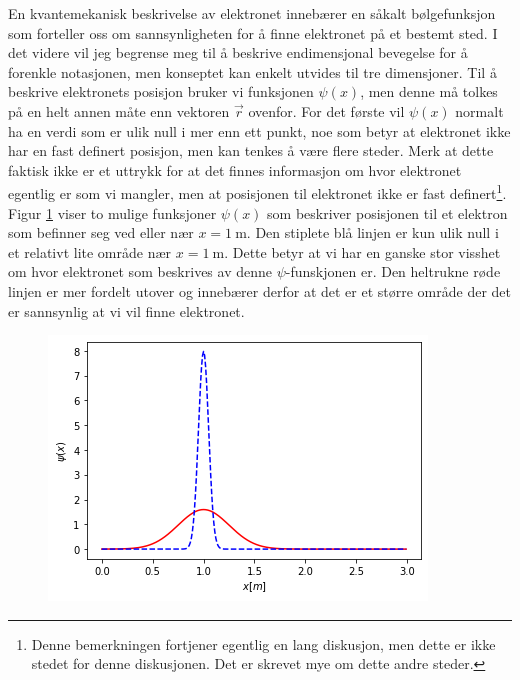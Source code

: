 En kvantemekanisk beskrivelse av elektronet innebærer en såkalt bølge\-funksjon som forteller oss om sannsynligheten for å finne elektronet på et bestemt sted. I det videre vil jeg begrense meg til å beskrive endimensjonal bevegelse for å forenkle notasjonen, men konseptet kan enkelt utvides til tre dimensjoner. Til å beskrive elektronets posisjon bruker vi funksjonen $\psi(x)$, men denne må tolkes på en helt annen måte enn vektoren $\vec{r}$ ovenfor. For det første vil $\psi(x)$ normalt ha en verdi som er ulik null i mer enn ett punkt, noe som betyr at elektronet ikke har en fast definert posisjon, men kan tenkes å være flere steder. Merk at dette faktisk ikke er et uttrykk for at det finnes informasjon om hvor elektronet egentlig er som vi mangler, men at posisjonen til elektronet ikke er fast definert\footnote{Denne bemerkningen fortjener egentlig en lang diskusjon, men dette er ikke stedet for denne diskusjonen. Det er skrevet mye om dette andre steder.}. Figur \ref{fig:kvante:psix} viser to mulige funksjoner $\psi(x)$ som beskriver posisjonen til et elektron som befinner seg ved eller nær $x=1~\mathrm{m}$. Den stiplete blå linjen er kun ulik null i et relativt lite område nær $x=1~\mathrm{m}$. Dette betyr at vi har en ganske stor visshet om hvor elektronet som beskrives av denne $\psi$-funskjonen er. Den heltrukne røde linjen er mer fordelt utover og innebærer derfor at det er et større område der det er sannsynlig at vi vil finne elektronet. 
\begin{figure}[htp]
\begin{center}
	\includegraphics[width=.5\textwidth]{./psix}
	\caption{}
	\label{fig:kvante:psix}
	\end{center}
\end{figure}

